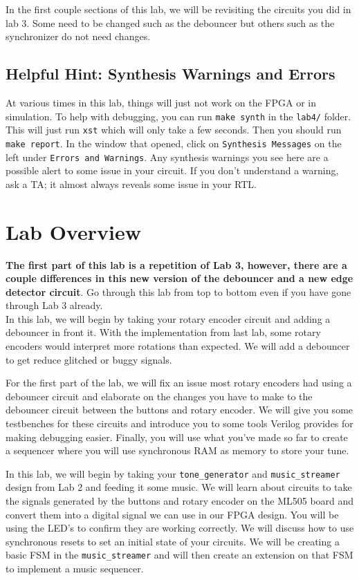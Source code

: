 \documentclass[11pt]{article}
\begin{document}
In the first couple sections of this lab, we will be revisiting the circuits you did in lab 3. Some need to be changed such as the debouncer but others such as the synchronizer do not need changes.

\subsection{Helpful Hint: Synthesis Warnings and Errors}
At various times in this lab, things will just not work on the FPGA or in simulation. To help with debugging, you can run \verb|make synth| in the \verb|lab4/| folder. This will just run \verb|xst| which will only take a few seconds. Then you should run \verb|make report|. In the window that opened, click on \verb|Synthesis Messages| on the left under \verb|Errors and Warnings|. Any synthesis warnings you see here are a possible alert to some issue in your circuit. If you don't understand a warning, ask a TA; it almost always reveals some issue in your RTL.

\section{Lab Overview}

\textbf{The first part of this lab is a repetition of Lab 3, however, there are a couple differences in this new version of the debouncer and a new edge detector circuit}. Go through this lab from top to bottom even if you have gone through Lab 3 already.\\

In this lab, we will begin by taking your rotary encoder circuit and adding a debouncer in front it. With the implementation from last lab, some rotary encoders would interpret more rotations than expected. We will add a debouncer to get reduce glitched or buggy signals.

For the first part of the lab, we will fix an issue most rotary encoders had using a debouncer circuit and elaborate on the changes you have to make to the debouncer circuit between the buttons and rotary encoder. We will give you some testbenches for these circuits and introduce you to some tools Verilog provides for making debugging easier. Finally, you will use what you've made so far to create a sequencer where you will use synchronous RAM as memory to store your tune.

In this lab, we will begin by taking your \verb|tone_generator| and \verb|music_streamer| design from Lab 2 and feeding it some music. We will learn about circuits to take the signals generated by the buttons and rotary encoder on the ML505 board and convert them into a digital signal we can use in our FPGA design. You will be using the LED's to confirm they are working correctly. We will discuss how to use synchronous resets to set an initial state of your circuits. We will be creating a basic FSM in the \verb|music_streamer| and will then create an extension on that FSM to implement a music sequencer. \\
\end{document}

